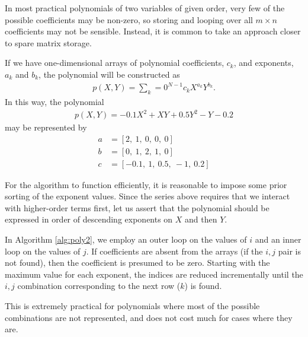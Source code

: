 \documentclass[letterpaper,11pt]{article}
\begin{document}
In most practical polynomials of two variables of given order, very few of the possible coefficients may be non-zero, so storing and looping over all $m\times n$ coefficients may not be sensible.  Instead, it is common to take an approach closer to spare matrix storage.

If we have one-dimensional arrays of polynomial coefficients, $c_k$, and exponents, $a_k$ and $b_k$, the polynomial will be constructed as
\begin{align}
p(X,Y) = \sum_k=0^{N-1} c_k X^{a_k} Y^{b_k}.
\end{align}
In this way, the polynomial
\begin{align}
p(X,Y) = -0.1 X^2 + XY + 0.5 Y^2 - Y - 0.2
\end{align}
may be represented by
\begin{align}
a &= \left[ 2,\ 1,\ 0,\ 0,\ 0\right]\\
b &= \left[ 0,\ 1,\ 2,\ 1,\ 0\right]\\
c &= \left[ -0.1,\ 1,\ 0.5,\ -1,\ 0.2\right]
\end{align}

For the algorithm to function efficiently, it is reasonable to impose some prior sorting of the exponent values.  Since the series above requires that we interact with higher-order terms first, let us assert that the polynomial should be expressed in order of descending exponents on $X$ and then $Y$.

In Algorithm \ref{alg:poly2}, we employ an outer loop on the values of $i$ and an inner loop on the values of $j$.  If coefficients are absent from the arrays (if the $i,j$ pair is not found), then the coefficient is presumed to be zero.  Starting with the maximum value for each exponent, the indices are reduced incrementally until the $i,j$ combination corresponding to the next row ($k$) is found.

This is extremely practical for polynomials where most of the possible combinations are not represented, and does not cost much for cases where they are.
\end{document}
